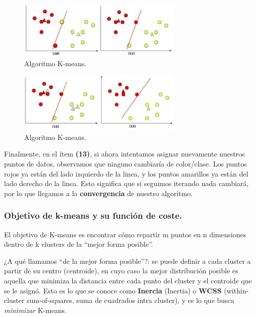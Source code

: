 \documentclass[12pt,a4paper]{article}
\begin{document}
\begin{sloppypar}
\begin{figure}[H]    %
 \centering
 \includegraphics[width=0.7\textwidth]{images/K_Means_5.png}
 \captionsetup{justification=centering,margin=2cm}
 \caption{Algoritmo K-means.}
\end{figure}

\begin{figure}[H]    %
 \centering
 \includegraphics[width=0.7\textwidth]{images/K_Means_6.png}
 \captionsetup{justification=centering,margin=2cm}
 \caption{Algoritmo K-means.}
\end{figure}

Finalmente, en el ítem \textbf{(13)}, si ahora intentamos asignar nuevamente nuestros puntos de datos, observamos que ninguno cambiaría de color/clase. Los puntos rojos ya están del lado izquierdo de la linea, y los puntos amarillos ya están del lado derecho de la linea. Esto significa que si seguimos iterando nada cambiará, por lo que llegamos a la \textbf{convergencia} de nuestro algoritmo.

\cleardoublepage
\subsubsection{Objetivo de k-means y su función de coste.}

El objetivo de K-means es encontrar cómo repartir m puntos en n dimensiones dentro de k clusters de la “mejor forma posible”. 

¿A qué llamamos “de la mejor forma posible”?: se puede definir a cada cluster a partir de su centro (centroide), en cuyo caso la mejor distribución posible es aquella que minimiza la distancia entre cada punto del cluster y el centroide que se le asignó. Esto es lo que se conoce como \textbf{Inercia} (Inertia) o \textbf{WCSS} (within-cluster sum-of-squares, suma de cuadrados intra cluster), y es lo que busca \textit{minimizar} K-means.


\end{sloppypar}
\end{document}
